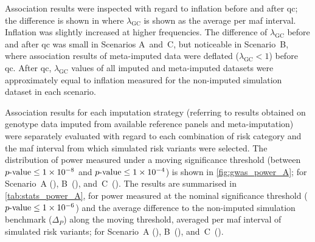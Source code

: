 %

%

Association results were inspected with regard to inflation before and after \gls{qc}; the difference is shown in  where $\lambda_\text{GC}$ is shown as the average per \gls{maf} interval.
Inflation was slightly increased at higher  frequencies.
The difference of $\lambda_\text{GC}$ before and after \gls{qc} was small in Scenarios A~and~C, but noticeable in Scenario~B, where association results of meta-imputed data were deflated (${\lambda_\text{GC} < 1}$) before \gls{qc}.
After \gls{qc}, $\lambda_\text{GC}$ values of all imputed and meta-imputed datasets were approximately equal to inflation measured for the non-imputed simulation dataset in each scenario.


%

%

%

%

Association results for each imputation strategy (referring to results obtained on genotype data imputed from available reference panels and meta-imputation) were separately evaluated with regard to each combination of risk category and the \gls{maf} interval from which simulated risk variants were selected.
The distribution of power measured under a moving significance threshold (between ${\mbox{$p$-value}\leq1\times10^{-8}}$ and ${\mbox{$p$-value}\leq1\times10^{-4}}$) is shown in \cref{fig:gwas_power_A}; for Scenario~A (), B~(), and~C~().
The results are summarised in \cref{tab:stats_power_A}, for power measured at the nominal significance threshold (${\mbox{$p$-value}\leq1\times10^{-6}}$) and the average difference to the non-imputed simulation benchmark ($\Delta_P$) along the moving threshold, averaged per \gls{maf} interval of simulated risk variants; for Scenario~A (), B~(), and~C~().

